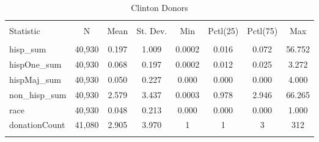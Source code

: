 
\begin{table}[!htbp] \centering 
  \caption{Clinton Donors} 
  \label{} 
\scriptsize 
\begin{tabular}{@{\extracolsep{5pt}}lccccccc} 
\\[-1.8ex]\hline 
\hline \\[-1.8ex] 
Statistic & \multicolumn{1}{c}{N} & \multicolumn{1}{c}{Mean} & \multicolumn{1}{c}{St. Dev.} & \multicolumn{1}{c}{Min} & \multicolumn{1}{c}{Pctl(25)} & \multicolumn{1}{c}{Pctl(75)} & \multicolumn{1}{c}{Max} \\ 
\hline \\[-1.8ex] 
hisp\_sum & 40,930 & 0.197 & 1.009 & 0.0002 & 0.016 & 0.072 & 56.752 \\ 
hispOne\_sum & 40,930 & 0.068 & 0.197 & 0.0002 & 0.012 & 0.025 & 3.272 \\ 
hispMaj\_sum & 40,930 & 0.050 & 0.227 & 0.000 & 0.000 & 0.000 & 4.000 \\ 
non\_hisp\_sum & 40,930 & 2.579 & 3.437 & 0.0003 & 0.978 & 2.946 & 66.265 \\ 
race & 40,930 & 0.048 & 0.213 & 0.000 & 0.000 & 0.000 & 1.000 \\ 
donationCount & 41,080 & 2.905 & 3.970 & 1 & 1 & 3 & 312 \\ 
\hline \\[-1.8ex] 
\end{tabular} 
\end{table} 
